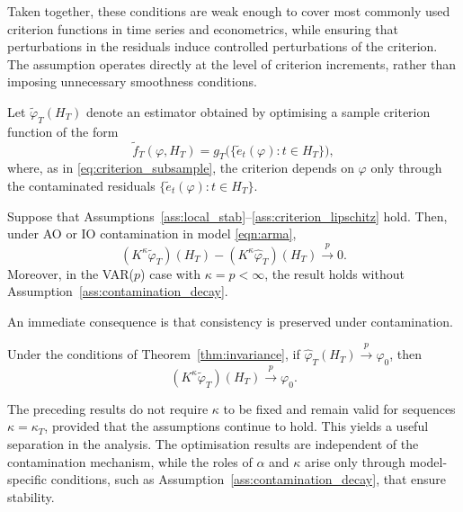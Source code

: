 \documentclass[12pt]{article}
\numberwithin{equation}{section}
\begin{document}
Taken together, these conditions are weak enough to cover most commonly used criterion functions in time series and econometrics, while ensuring that perturbations in the residuals induce controlled perturbations of the criterion. 
The assumption operates directly at the level of criterion increments, rather than imposing unnecessary smoothness conditions.

Let $\tilde{\varphi}_T(H_T)$ denote an estimator obtained by optimising a sample criterion function of the form
\begin{equation}\label{eq:criterion_consubsample}
\tilde f_T(\varphi,H_T)
=
g_T\bigl(\{\tilde e_t(\varphi):t\in H_T\}\bigr),
\end{equation}
where, as in \eqref{eq:criterion_subsample}, the criterion depends on $\varphi$ only through the contaminated residuals $\{\tilde e_t(\varphi):t\in H_T\}$.

\begin{theorem}
\label{thm:invariance}
Suppose that Assumptions~\ref{ass:local_stab}--\ref{ass:criterion_lipschitz} hold.
Then, under AO or IO contamination in model \eqref{eqn:arma},
\begin{equation}
(K^\kappa \tilde{\varphi}_T)(H_T) - (K^\kappa \hat{\varphi}_T)(H_T)\overset{p}{\longrightarrow}0.
\end{equation}
Moreover, in the VAR($p$) case with $\kappa = p < \infty$, the result holds without Assumption~\ref{ass:contamination_decay}.
\end{theorem}

An immediate consequence is that consistency is preserved under contamination.

\begin{corollary}\label{cor:consistency}
Under the conditions of Theorem~\ref{thm:invariance}, if
$\hat{\varphi}_T(H_T)\overset{p}{\longrightarrow}\varphi_0$,
then
\begin{equation}
(K^\kappa \tilde{\varphi}_T)(H_T)\overset{p}{\longrightarrow}\varphi_0.
\end{equation}
\end{corollary}

The preceding results do not require $\kappa$ to be fixed and remain valid for sequences $\kappa=\kappa_T$, provided that the assumptions continue to hold. 
This yields a useful separation in the analysis. 
The optimisation results are independent of the contamination mechanism, while the roles of $\alpha$ and $\kappa$ arise only through model-specific conditions, such as Assumption~\ref{ass:contamination_decay}, that ensure stability.
\end{document}
